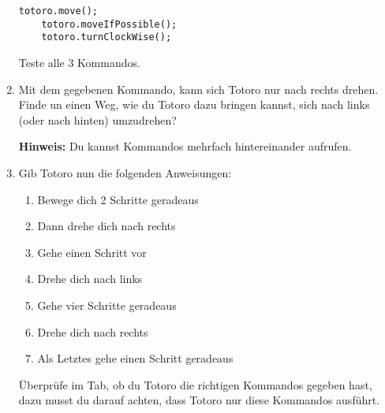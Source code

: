 \begin{enumerate}
        \begin{lstlisting}[firstnumber=20]
    totoro.move();
    totoro.moveIfPossible();
    totoro.turnClockWise();
        \end{lstlisting}

        Teste alle 3 Kommandos.\\
        \item Mit dem gegebenen Kommando, kann sich Totoro nur nach rechts drehen.\\
        Finde un einen Weg, wie du Totoro dazu bringen kannst, sich nach links (oder nach hinten) umzudrehen?
        
        \textbf{Hinweis:} Du kannst Kommandos mehrfach hintereinander aufrufen.
        \item Gib Totoro nun die folgenden Anweisungen:
        
        {
\begin{enumerate}
\item Bewege dich 2 Schritte geradeaus
\item Dann drehe dich nach rechts
\item Gehe einen Schritt vor
\item Drehe dich nach links
\item Gehe vier Schritte geradeaus
\item Drehe dich nach rechts
\item Als Letztes gehe einen Schritt geradeaus
\end{enumerate}
}

Überprüfe im  Tab, ob du Totoro die richtigen Kommandos gegeben hast, dazu musst du darauf achten, dass Totoro nur diese Kommandos ausführt.
\end{enumerate}

